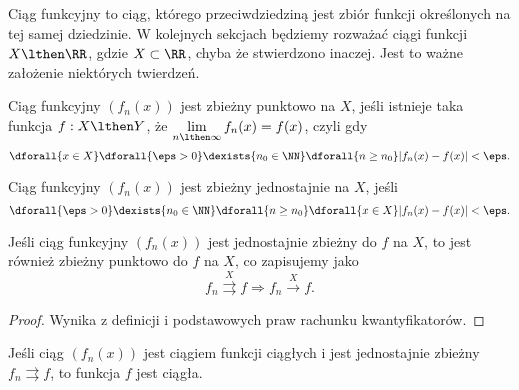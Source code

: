 Ciąg funkcyjny to ciąg, którego przeciwdziedziną jest zbiór funkcji określonych na tej samej dziedzinie. W kolejnych sekcjach będziemy rozważać ciągi funkcji $X \lthen \RR$, gdzie $X \subset \RR$, chyba że stwierdzono inaczej. Jest to ważne założenie niektórych twierdzeń.

\begin{definition}
    Ciąg funkcyjny $(f_n(x))$ jest zbieżny punktowo na $X$, jeśli istnieje taka funkcja $f: X \lthen Y$, że $\lim\limits_{n\lthen\infty} f_n(x) = f(x)$, czyli gdy
    \[ \dforall{x \in X} \dforall{\eps > 0} \dexists{n_0 \in \NN} \dforall{n \geq n_0} |f_n(x) - f(x)| < \eps. \]
\end{definition}

\begin{definition}
    Ciąg funkcyjny $(f_n(x))$ jest zbieżny jednostajnie na $X$, jeśli
    \[ \dforall{\eps > 0} \dexists{n_0 \in \NN} \dforall{n \geq n_0} \dforall{x \in X} |f_n(x) - f(x)| < \eps. \]
\end{definition}

\begin{theorem}
    \label{t:uniform convergence implies pointwise convergence}
    Jeśli ciąg funkcyjny $(f_n(x))$ jest jednostajnie zbieżny do $f$ na $X$, to jest również zbieżny punktowo do $f$ na $X$, co zapisujemy jako
    \[ f_n \overset{X}{\rightrightarrows} f \Longrightarrow f_n  \overset{X}{\rightarrow} f. \]
\end{theorem}
\begin{proof}
    Wynika z definicji i podstawowych praw rachunku kwantyfikatorów.
\end{proof}

\begin{theorem}
    \label{t:continuous limit}
    Jeśli ciąg $(f_n(x))$ jest ciągiem funkcji ciągłych i jest jednostajnie zbieżny $f_n \rightrightarrows f$, to funkcja $f$ jest ciągła.
\end{theorem}

